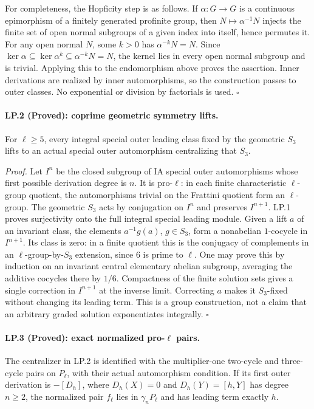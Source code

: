 For completeness, the Hopficity step is as follows. If $\alpha:G\to G$
is a continuous epimorphism of a finitely generated profinite group,
then $N\mapsto\alpha^{-1}N$ injects the finite set of open normal
subgroups of a given index into itself, hence permutes it. For any
open normal $N$, some $k>0$ has $\alpha^{-k}N=N$. Since
$\ker\alpha\subseteq\ker\alpha^k\subseteq\alpha^{-k}N=N$,
the kernel lies in every open normal subgroup and is trivial.
Applying this to the endomorphism above proves the assertion.
Inner derivations are realized by inner automorphisms, so the
construction passes to outer classes. No exponential or division by
factorials is used. \hfill$\square$

\paragraph{LP.2 (Proved): coprime geometric symmetry lifts.}
For $\ell\geq5$, every integral special outer leading class fixed by
the geometric $S_3$ lifts to an actual special outer automorphism
centralizing that $S_3$.

\emph{Proof.}
Let $I^n$ be the closed subgroup of IA special outer automorphisms
whose first possible derivation degree is $n$. It is pro-$\ell$:
in each finite characteristic $\ell$-group quotient, the automorphisms
trivial on the Frattini quotient form an $\ell$-group. The geometric
$S_3$ acts by conjugation on $I^n$ and preserves $I^{n+1}$.
LP.1 proves surjectivity onto the full integral special leading module.
Given a lift $a$ of an invariant class, the elements $a^{-1}g(a)$,
$g\in S_3$, form a nonabelian $1$-cocycle in $I^{n+1}$.
Its class is zero: in a finite quotient this is the conjugacy of
complements in an $\ell$-group-by-$S_3$ extension, since $6$ is
prime to $\ell$. One may prove this by induction on an invariant
central elementary abelian subgroup, averaging the additive
cocycles there by $1/6$. Compactness of the finite solution sets
gives a single correction in $I^{n+1}$ at the inverse limit.
Correcting $a$ makes it $S_3$-fixed without changing its leading
term. This is a group construction, not a claim that an arbitrary
graded solution exponentiates integrally. \hfill$\square$

\paragraph{LP.3 (Proved): exact normalized pro-$\ell$ pairs.}
The centralizer in LP.2 is identified with the multiplier-one
two-cycle and three-cycle pairs on $P_\ell$, with their actual
automorphism condition. If its first outer derivation is $-[D_h]$,
where $D_h(X)=0$ and $D_h(Y)=[h,Y]$ has degree $n\geq2$, the
normalized pair $f_\ell$ lies in $\gamma_nP_\ell$ and has leading
term exactly $h$.

